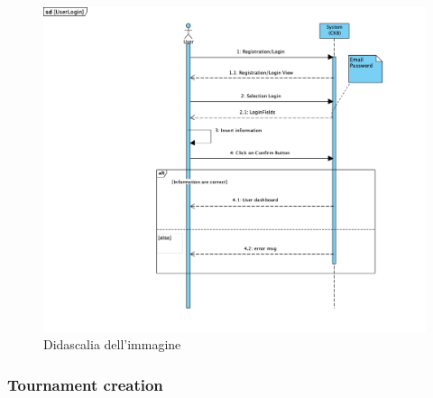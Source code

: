     \begin{figure}[H]
  \includegraphics[width=1\linewidth]{SequenceDiagram/UserLogin.png} 
  \caption{Didascalia dell'immagine}
  \label{fig:immagine}
\end{figure}

\subsubsection{Tournament creation}

